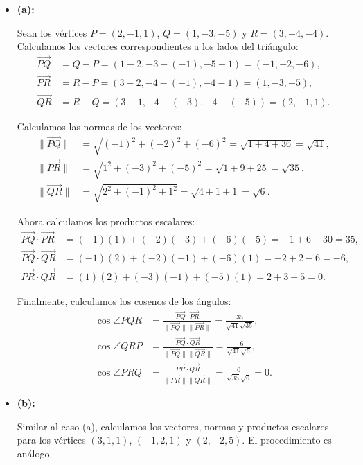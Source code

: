 \begin{itemize}
    \item \textbf{(a):}

    Sean los vértices $P = (2, -1, 1)$, $Q = (1, -3, -5)$ y $R = (3, -4, -4)$. Calculamos los vectores correspondientes a los lados del triángulo:
    \begin{align*}
        \overrightarrow{PQ} &= Q - P = (1 - 2, -3 - (-1), -5 - 1) = (-1, -2, -6), \\
        \overrightarrow{PR} &= R - P = (3 - 2, -4 - (-1), -4 - 1) = (1, -3, -5), \\
        \overrightarrow{QR} &= R - Q = (3 - 1, -4 - (-3), -4 - (-5)) = (2, -1, 1).
    \end{align*}

    Calculamos las normas de los vectores:
    \begin{align*}
        \|\overrightarrow{PQ}\| &= \sqrt{(-1)^2 + (-2)^2 + (-6)^2} = \sqrt{1 + 4 + 36} = \sqrt{41}, \\
        \|\overrightarrow{PR}\| &= \sqrt{1^2 + (-3)^2 + (-5)^2} = \sqrt{1 + 9 + 25} = \sqrt{35}, \\
        \|\overrightarrow{QR}\| &= \sqrt{2^2 + (-1)^2 + 1^2} = \sqrt{4 + 1 + 1} = \sqrt{6}.
    \end{align*}

    Ahora calculamos los productos escalares:
    \begin{align*}
        \overrightarrow{PQ} \cdot \overrightarrow{PR} &= (-1)(1) + (-2)(-3) + (-6)(-5) = -1 + 6 + 30 = 35, \\
        \overrightarrow{PQ} \cdot \overrightarrow{QR} &= (-1)(2) + (-2)(-1) + (-6)(1) = -2 + 2 - 6 = -6, \\
        \overrightarrow{PR} \cdot \overrightarrow{QR} &= (1)(2) + (-3)(-1) + (-5)(1) = 2 + 3 - 5 = 0.
    \end{align*}

    Finalmente, calculamos los cosenos de los ángulos:
    \begin{align*}
        \cos \angle PQR &= \frac{\overrightarrow{PQ} \cdot \overrightarrow{PR}}{\|\overrightarrow{PQ}\| \|\overrightarrow{PR}\|} = \frac{35}{\sqrt{41} \sqrt{35}}, \\
        \cos \angle QRP &= \frac{\overrightarrow{PQ} \cdot \overrightarrow{QR}}{\|\overrightarrow{PQ}\| \|\overrightarrow{QR}\|} = \frac{-6}{\sqrt{41} \sqrt{6}}, \\
        \cos \angle PRQ &= \frac{\overrightarrow{PR} \cdot \overrightarrow{QR}}{\|\overrightarrow{PR}\| \|\overrightarrow{QR}\|} = \frac{0}{\sqrt{35} \sqrt{6}} = 0.
    \end{align*}

    \item \textbf{(b):}

    Similar al caso (a), calculamos los vectores, normas y productos escalares para los vértices $(3, 1, 1)$, $(-1, 2, 1)$ y $(2, -2, 5)$. El procedimiento es análogo.
\end{itemize}